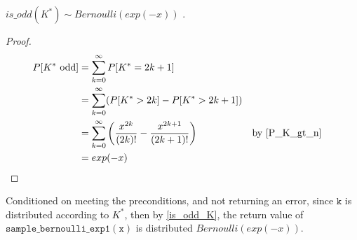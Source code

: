 \documentclass{article}
\begin{document}
\begin{theorem}
\label{is_odd_K}
$is\_odd(K^{*}) \sim Bernoulli(exp(-x))$ \cite{CKS20}.
\end{theorem}

\begin{proof}
\begin{align*}
P[K^{*} \text{ odd}] &= \sum_{k=0}^\infty P[K^{*} = 2k + 1] \\
&= \sum_{k=0}^\infty (P[K^{*} > 2k] - P[K^{*} > 2k + 1]) \\
&= \sum_{k=0}^\infty \left(\frac{x^{2k}}{(2k)!} - \frac{x^{2k + 1}}{(2k + 1)!}\right) && \text{by } \ref{P_K_gt_n} \\
&= exp(-x)
\end{align*}

\end{proof}

Conditioned on meeting the preconditions, and not returning an error, 
since $\mathtt{k}$ is distributed according to $K^{*}$, then by \ref{is_odd_K}, 
the return value of $\mathtt{sample\_bernoulli\_exp1(x)}$ is distributed $Bernoulli(exp(-x))$.



\end{document}
